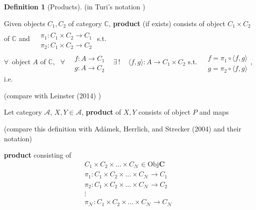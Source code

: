\documentclass[twoside,landscape,10pt]{amsart}
\theoremstyle{plain}
\theoremstyle{definition}
\newtheorem{definition}{Definition}
\theoremstyle{remark}
\begin{document}
\begin{multicols*}{2}
\begin{definition}[Products]

(in Turi's notation \cite{Turi2001})

Given objects $C_1,C_2$ of category $\mathbb{C}$, \textbf{product} (if exists) consists of object $C_1 \times C_2$ of $\mathbb{C}$ and $\begin{aligned} & \quad \\
  & \pi_1 : C_1 \times C_2 \to C_1 \\
  & \pi_2: C_1 \times C_2 \to C_2 \end{aligned}$ s.t. \\
$\forall \, $ object $A$ of $\mathbb{C}$, \, $\forall \, \begin{aligned} & \quad \\
  & f : A \to C_1 \\
  & g : A \to C_2 \end{aligned}$ \quad \, $\exists \, ! \quad \, \langle f,g \rangle : A \to C_1 \times C_2$ s.t. $\begin{aligned} & \quad \\
  & f = \pi_1 \circ \langle f,g \rangle \\
  & g = \pi_2 \circ \langle f,g \rangle \end{aligned}$, i.e. 


(compare with Leinster (2014) \cite{Lein2014})

Let category $\mathcal{A}$, $X,Y \in \mathcal{A}$, \textbf{product} of $X,Y$ consists of object $P$ and maps

(compare this definition with Ad\'{a}mek, Herrlich, and Strecker (2004) \cite{AHS2004} and their notation)

\textbf{product} consisting of 
\[
\begin{aligned}
  C_1 \times C_2 \times \dots \times C_{\mathcal{N}} \in \text{Obj}\mathbf{C} \\
  \pi_1 : C_1 \times C_2 \times \dots \times C_{\mathcal{N}} \to C_1 \\ 
  \pi_2 : C_1 \times C_2 \times \dots \times C_{\mathcal{N}} \to C_2 \\ 
\vdots \\
  \pi_{\mathcal{N}} : C_1 \times C_2 \times \dots \times C_{\mathcal{N}} \to C_{\mathcal{N}} \\ 
\end{aligned}
\]


\end{definition}
\end{multicols*}
\end{document}
